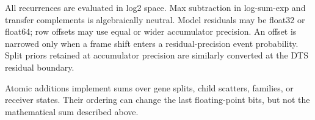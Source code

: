 \documentclass[11pt]{article}
\begin{document}
All recurrences are evaluated in log2 space.  Max subtraction in log-sum-exp
and transfer complements is algebraically neutral.  Model residuals may be
float32 or float64; row offsets may use equal or wider accumulator precision.
An offset is narrowed only when a frame shift enters a residual-precision event
probability.  Split priors retained at accumulator precision are similarly
converted at the DTS residual boundary.

Atomic additions implement sums over gene splits, child scatters, families,
or receiver states.  Their ordering can change the last floating-point bits,
but not the mathematical sum described above.
\end{document}
